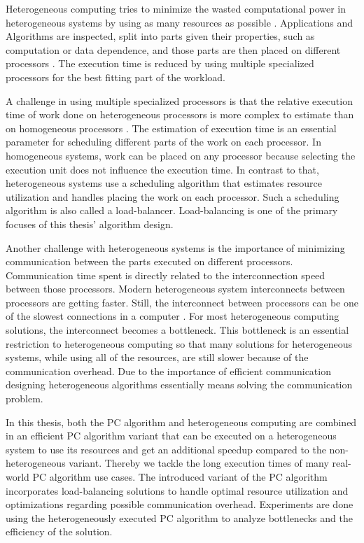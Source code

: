 Heterogeneous computing tries to minimize the wasted computational power in heterogeneous systems by using as many resources as possible \cite{khokharHeterogeneousComputingChallenges1993}. Applications and Algorithms are inspected, split into parts given their properties, such as computation or data dependence, and those parts are then placed on different processors \cite{breshearsArtConcurrencyThread2009}. The execution time is reduced by using multiple specialized processors for the best fitting part of the workload.

A challenge in using multiple specialized processors is that the relative execution time of work done on heterogeneous processors is more complex to estimate than on homogeneous processors \cite{liuEstimationAccuracyExecution2016}. The estimation of execution time is an essential parameter for scheduling different parts of the work on each processor. In homogeneous systems, work can be placed on any processor because selecting the execution unit does not influence the execution time. In contrast to that, heterogeneous systems use a scheduling algorithm that estimates resource utilization and handles placing the work on each processor. Such a scheduling algorithm is also called a load-balancer. Load-balancing is one of the primary focuses of this thesis' algorithm design.

Another challenge with heterogeneous systems is the importance of minimizing communication between the parts executed on different processors. Communication time spent is directly related to the interconnection speed between those processors. Modern heterogeneous system interconnects between processors are getting faster. Still, the interconnect between processors can be one of the slowest connections in a computer \cite{geladoAsymmetricDistributedShared2010}. For most heterogeneous computing solutions, the interconnect becomes a bottleneck. This bottleneck is an essential restriction to heterogeneous computing so that many solutions for heterogeneous systems, while using all of the resources, are still slower because of the communication overhead. Due to the importance of efficient communication designing heterogeneous algorithms essentially means solving the communication problem.

In this thesis, both the PC algorithm and heterogeneous computing are combined in an efficient PC algorithm variant that can be executed on a heterogeneous system to use its resources and get an additional speedup compared to the non-heterogeneous variant. Thereby we tackle the long execution times of many real-world PC algorithm use cases. The introduced variant of the PC algorithm incorporates load-balancing solutions to handle optimal resource utilization and optimizations regarding possible communication overhead. Experiments are done using the heterogeneously executed PC algorithm to analyze bottlenecks and the efficiency of the solution.

